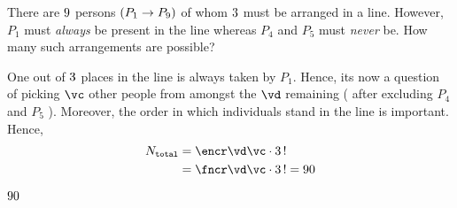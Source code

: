 

\SUBTRACT{}\vc 
\SUBTRACT{}\vd

\question[2] There are $9$ persons $(P_1\to P_{9})$ of whom $3$ must be arranged
in a line. However, $P_1$ must \textit{always} be present in the line whereas $P_4$ and $P_5$ must \textit{never} be. 
How many such arrangements are possible?

\watchout[-30pt]

\begin{solution}[\mcq]
	One out of $3$ places in the line is always taken by $P_1$. Hence, its now a question of picking
	$\vc$ other people from amongst the $\vd$ remaining ( after excluding $P_4$ and $P_5$ ). Moreover,
	the order in which individuals stand in the line is important. Hence, 
	\begin{align}
		N_{\texttt{total}} &= \encr\vd\vc\cdot \vb\,! \\
		&= \fncr\vd\vc\cdot \vb\,! = \ve
	\end{align}
\end{solution}

\ifprintanswers
  \begin{codex}
    $90$
  \end{codex}
\fi 


